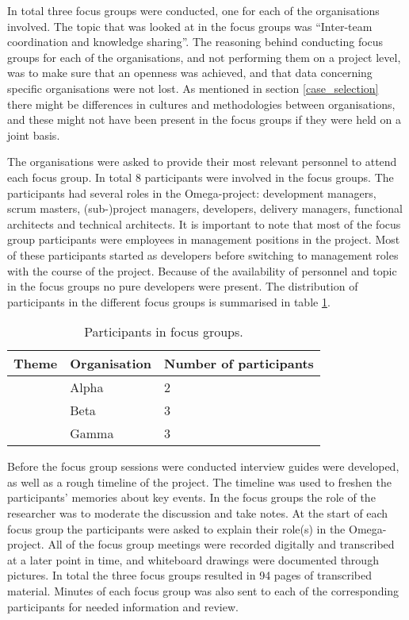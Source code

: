 \vspace{0.5cm}

In total three focus groups were conducted, one for each of the organisations involved. The topic that was looked at in the focus groups was ``Inter-team coordination and knowledge sharing''. The reasoning behind conducting focus groups for each of the organisations, and not performing them on a project level, was to make sure that an openness was achieved, and that data concerning specific organisations were not lost. As mentioned in section \ref{case_selection} there might be differences in cultures and methodologies between organisations, and these might not have been present in the focus groups if they were held on a joint basis.

The organisations were asked to provide their most relevant personnel to attend each focus group. In total 8 participants were involved in the focus groups. The participants had several roles in the Omega-project: development managers, scrum masters, (sub-)project managers, developers, delivery managers, functional architects and technical architects. It is important to note that most of the focus group participants were employees in management positions in the project. Most of these participants started as developers before switching to management roles with the course of the project. Because of the availability of personnel and topic in the focus groups no pure developers were present. The distribution of participants in the different focus groups is summarised in table \ref{pifg}.

\begin{table}[H]
\begin{center}
    \begin{tabular}{ | p{5.5cm} | p{4cm} | p{5cm} |}
    \hline
    \textbf{Theme} & \textbf{Organisation} & \textbf{Number of participants} \\ \hline
    \multirow{3}{*}{} & Alpha & 2 \\ \cline{2-3}
    Inter-team coordination and knowledge sharing & Beta & 3 \\ \cline{2-3}
    & Gamma & 3 \\ \hline
    \end{tabular}
    \caption{Participants in focus groups.}
    \label{pifg}
\end{center}
\end{table}


Before the focus group sessions were conducted interview guides were developed, as well as a rough timeline of the project. The timeline was used to freshen the participants' memories about key events. In the focus groups the role of the researcher was to moderate the discussion and take notes. At the start of each focus group the participants were asked to explain their role(s) in the Omega-project. All of the focus group meetings were recorded digitally and transcribed at a later point in time, and whiteboard drawings were documented through pictures. In total the three focus groups resulted in 94 pages of transcribed material. Minutes of each focus group was also sent to each of the corresponding participants for needed information and review.

